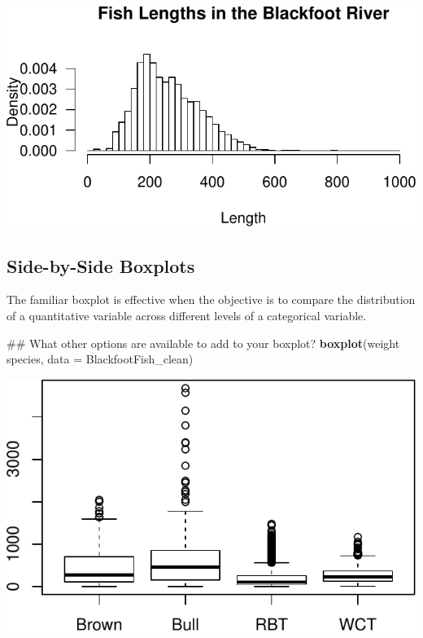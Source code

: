 \documentclass[]{article}
\newenvironment{Shaded}{\begin{snugshade}}{\end{snugshade}}
\newcommand{\KeywordTok}[1]{\textcolor[rgb]{0.13,0.29,0.53}{\textbf{#1}}}
\newcommand{\DataTypeTok}[1]{\textcolor[rgb]{0.13,0.29,0.53}{#1}}
\newcommand{\StringTok}[1]{\textcolor[rgb]{0.31,0.60,0.02}{#1}}
\newcommand{\OperatorTok}[1]{\textcolor[rgb]{0.81,0.36,0.00}{\textbf{#1}}}
\newcommand{\NormalTok}[1]{#1}
\begin{document}
\begin{center}\includegraphics{RTutorial_files/figure-latex/hist4-1} \end{center}

\subsection{Side-by-Side Boxplots}\label{side-by-side-boxplots}

The familiar boxplot is effective when the objective is to compare the
distribution of a quantitative variable across different levels of a
categorical variable.

\vspace{0.25cm}

\begin{Shaded}
\begin{Highlighting}[]
\NormalTok{## What other options are available to add to your boxplot?}
\KeywordTok{boxplot}\NormalTok{(weight }\OperatorTok{~}\StringTok{ }\NormalTok{species, }
        \DataTypeTok{data =}\NormalTok{ BlackfootFish_clean)}
\end{Highlighting}
\end{Shaded}

\begin{center}\includegraphics{RTutorial_files/figure-latex/boxplot-1} \end{center}
\end{document}

